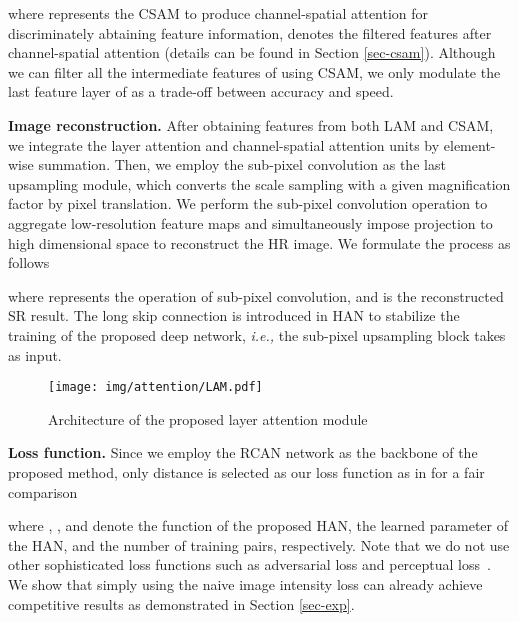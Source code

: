\documentclass[runningheads]{llncs}
\begin{document}
\noindent where  represents the CSAM to produce channel-spatial attention for discriminately abtaining feature information,  denotes the filtered features after channel-spatial attention (details can be found in Section \ref{sec-csam}). 
Although we can filter all the intermediate features of  using CSAM, we only modulate the last feature layer of  as a trade-off between accuracy and speed.







\textbf{Image reconstruction.} After obtaining features from both LAM and CSAM, we integrate the layer attention and channel-spatial attention units by element-wise summation.
Then, we employ the sub-pixel convolution \cite{shi2016real} as the last upsampling module,
which converts the scale sampling with a given magnification factor
by pixel translation.  We perform the sub-pixel convolution operation to aggregate low-resolution feature maps and simultaneously impose projection to high dimensional space to reconstruct the HR image. We formulate the process as follows

where  represents the operation of sub-pixel convolution, and  is the reconstructed SR result.
The long skip connection is introduced in HAN to stabilize the training of the proposed deep network, \textit{i.e.,} the sub-pixel upsampling block takes  as input.




\begin{figure*}[t]\footnotesize
	\begin{center}
		\texttt{[image: img/attention/LAM.pdf]}
	\end{center}


	\caption{Architecture of the proposed layer attention module
}

	\label{fig-Layer_attention}
\end{figure*}


\textbf{Loss function.} Since we employ the RCAN network as the backbone of the proposed method, only  distance is selected as our loss function as in \cite{zhang2018image} for a fair comparison

where , , and  denote the function of the proposed HAN, the learned parameter of the HAN, and the number of training pairs, respectively.
	Note that we do not use other sophisticated loss functions such as adversarial loss \cite{NIPS2014_5423} and perceptual loss~\cite{johnson2016perceptual}. We show that simply using the
	naive image intensity loss  can already achieve
	competitive results as demonstrated in Section \ref{sec-exp}.
\end{document}
